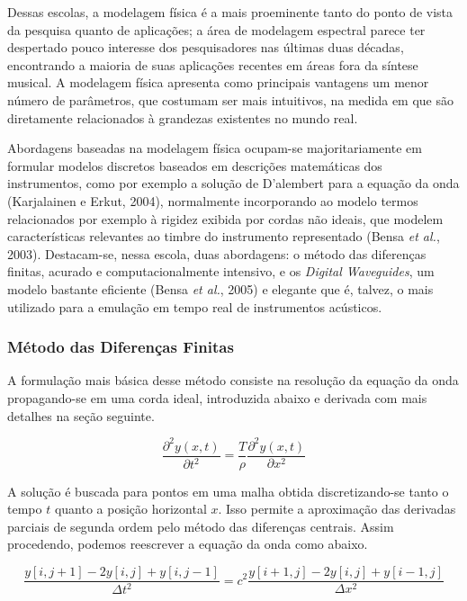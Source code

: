 \documentclass[]{article}
\begin{document}
Dessas escolas, a modelagem física é a mais proeminente tanto do ponto
de vista da pesquisa quanto de aplicações; a área de modelagem espectral
parece ter despertado pouco interesse dos pesquisadores nas últimas duas
décadas, encontrando a maioria de suas aplicações recentes em áreas fora
da síntese musical. A modelagem física apresenta como principais
vantagens um menor número de parâmetros, que costumam ser mais
intuitivos, na medida em que são diretamente relacionados à grandezas
existentes no mundo real.

Abordagens baseadas na modelagem física ocupam-se majoritariamente em
formular modelos discretos baseados em descrições matemáticas dos
instrumentos, como por exemplo a solução de D'alembert para a equação da
onda (Karjalainen e Erkut, 2004), normalmente incorporando ao modelo
termos relacionados por exemplo à rigidez exibida por cordas não ideais,
que modelem características relevantes ao timbre do instrumento
representado (Bensa \emph{et al.}, 2003). Destacam-se, nessa escola,
duas abordagens: o método das diferenças finitas, acurado e
computacionalmente intensivo, e os \emph{Digital Waveguides}, um modelo
bastante eficiente (Bensa \emph{et al.}, 2005) e elegante que é, talvez,
o mais utilizado para a emulação em tempo real de instrumentos
acústicos.

\hypertarget{muxe9todo-das-diferenuxe7as-finitas}{%
\subsubsection{Método das Diferenças
Finitas}\label{muxe9todo-das-diferenuxe7as-finitas}}

A formulação mais básica desse método consiste na resolução da equação
da onda propagando-se em uma corda ideal, introduzida abaixo e derivada
com mais detalhes na seção seguinte.

\begin{equation}\frac{\partial^2 y(x,t)}{\partial t^2} =\frac{T}{\rho} \frac{\partial^2 y(x,t)}{\partial x^2}\label{eq:onda}\end{equation}

A solução é buscada para pontos em uma malha obtida discretizando-se
tanto o tempo \(t\) quanto a posição horizontal \(x\). Isso permite a
aproximação das derivadas parciais de segunda ordem pelo método das
diferenças centrais. Assim procedendo, podemos reescrever a equação da
onda como abaixo.

\[\frac{y[i,j+1]-2y[i,j]+y[i,j-1]}{\Delta t^2} = c^2 \frac{y[i+1,j]-2y[i,j]+y[i-1,j]}{\Delta x^2}\]
\end{document}
